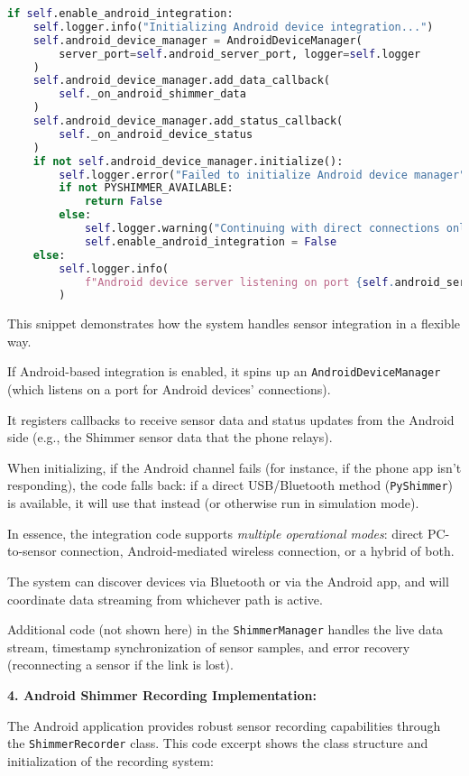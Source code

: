 {{{\begin{lstlisting}[language=Python]
if self.enable_android_integration:
    self.logger.info("Initializing Android device integration...")
    self.android_device_manager = AndroidDeviceManager(
        server_port=self.android_server_port, logger=self.logger
    )
    self.android_device_manager.add_data_callback(
        self._on_android_shimmer_data
    )
    self.android_device_manager.add_status_callback(
        self._on_android_device_status
    )
    if not self.android_device_manager.initialize():
        self.logger.error("Failed to initialize Android device manager")
        if not PYSHIMMER_AVAILABLE:
            return False
        else:
            self.logger.warning("Continuing with direct connections only")
            self.enable_android_integration = False
    else:
        self.logger.info(
            f"Android device server listening on port {self.android_server_port}"
        )
\end{lstlisting}

This snippet demonstrates how the system handles sensor integration in a flexible way.

If Android-based integration is enabled, it spins up an \texttt{AndroidDeviceManager}
(which listens on a port for Android devices' connections).

It registers callbacks to receive sensor data and status updates from the Android
side (e.g., the Shimmer sensor data that the phone relays).

When initializing, if the Android channel fails (for instance, if the phone app isn't
responding), the code falls back: if a direct USB/Bluetooth method
(\texttt{PyShimmer}) is available, it will use that instead (or otherwise run in
simulation mode).

In essence, the integration code supports \textit{multiple operational modes}: direct
PC-to-sensor connection, Android-mediated wireless connection, or a hybrid of both.

The system can discover devices via Bluetooth or via the Android app, and will
coordinate data streaming from whichever path is active.

Additional code (not shown here) in the \texttt{ShimmerManager} handles the live data
stream, timestamp synchronization of sensor samples, and error recovery (reconnecting
a sensor if the link is lost).

\textbf{4. Android Shimmer Recording Implementation:}

The Android application provides robust sensor recording capabilities through the 
\texttt{ShimmerRecorder} class. This code excerpt shows the class structure and 
initialization of the recording system:

}}}
